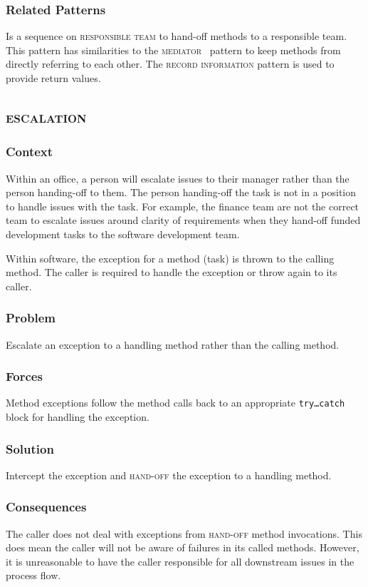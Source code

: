 \documentclass[prodmode]{style/acmlarge}
\begin{document}
\subsubsection*{Related Patterns} Is a sequence on \textsc{responsible team} to
hand-off methods to a responsible team.  This pattern has similarities to the
\textsc{mediator}~\cite{gof} pattern to keep methods from directly referring to
each other.  The \textsc{record information} pattern is used to provide return
values.



\subsection{\textsc{\textbf{escalation}}}

\subsubsection*{Context} Within an office, a person will escalate issues to
their manager rather than the person handing-off to them.  The person
handing-off the task is not in a position to handle issues with the task.  For
example, the finance team are not the correct team to escalate issues around
clarity of requirements when they hand-off funded development tasks to the
software development team.

Within software, the exception for a method (task) is thrown to the calling
method.  The caller is required to handle the exception or throw again to its
caller.

\subsubsection*{\textbf{Problem}} Escalate an exception to a handling method rather than
the calling method.

\subsubsection*{Forces} Method exceptions follow the method calls back to an
appropriate \texttt{try\ldots catch} block for handling the exception.

\subsubsection*{\textbf{Solution}} Intercept the exception and \textsc{hand-off} the
exception to a handling method.

\subsubsection*{Consequences} The caller does not deal with exceptions from
\textsc{hand-off} method invocations.  This does mean the caller will not be
aware of failures in its called methods.  However, it is unreasonable to have
the caller responsible for all downstream issues in the process flow.
\end{document}
